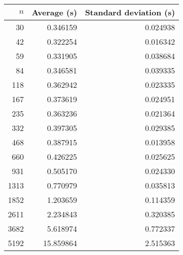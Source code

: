 \begin{tabular}{rrr}
$n$ & Average (s) & Standard deviation (s)\\\hline
30 & 0.346159 & 0.024938\\
42 & 0.322254 & 0.016342\\
59 & 0.331905 & 0.038684\\
84 & 0.346581 & 0.039335\\
118 & 0.362942 & 0.023335\\
167 & 0.373619 & 0.024951\\
235 & 0.363236 & 0.021364\\
332 & 0.397305 & 0.029385\\
468 & 0.387915 & 0.013958\\
660 & 0.426225 & 0.025625\\
931 & 0.505170 & 0.024330\\
1313 & 0.770979 & 0.035813\\
1852 & 1.203659 & 0.114359\\
2611 & 2.234843 & 0.320385\\
3682 & 5.618974 & 0.772337\\
5192 & 15.859864 & 2.515363\\
\end{tabular}
